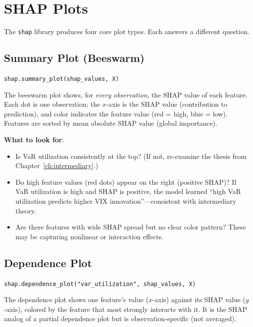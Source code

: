 \section{SHAP Plots}
\label{sec:shap-plots}

The \texttt{shap} library produces four core plot types.
Each answers a different question.

\subsection{Summary Plot (Beeswarm)}

\texttt{shap.summary\_plot(shap\_values, X)}

The beeswarm plot shows, for \emph{every observation}, the SHAP value of each feature.
Each dot is one observation; the $x$-axis is the SHAP value (contribution to prediction), and color indicates the feature value (red = high, blue = low).
Features are sorted by mean absolute SHAP value (global importance).

\textbf{What to look for}:
\begin{itemize}[nosep]
  \item Is VaR utilization consistently at the top? (If not, re-examine the thesis from Chapter~\ref{ch:intermediary}.)
  \item Do high feature values (red dots) appear on the right (positive SHAP)? If VaR utilization is high and SHAP is positive, the model learned ``high VaR utilization predicts higher VIX innovation''---consistent with intermediary theory.
  \item Are there features with wide SHAP spread but no clear color pattern? These may be capturing nonlinear or interaction effects.
\end{itemize}

\subsection{Dependence Plot}

\texttt{shap.dependence\_plot("var\_utilization", shap\_values, X)}

The dependence plot shows one feature's value ($x$-axis) against its SHAP value ($y$-axis), colored by the feature that most strongly interacts with it.
It is the SHAP analog of a partial dependence plot but is observation-specific (not averaged).

